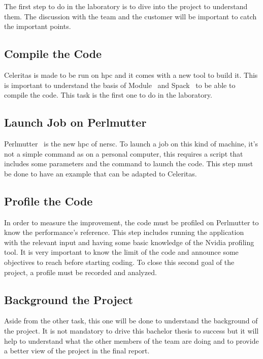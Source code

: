 The first step to do in the laboratory is to dive into the project to understand them.
The discussion with the team and the customer will be important to catch the important points.


\subsection{Compile the Code}
\label{spec:ch:activities:understand-the-project:compile-the-code}

Celeritas is made to be run on \acrshort{hpc} and it comes with a new tool to build it.
This is important to understand the basis of Module~\cite{Module} and Spack~\cite{Spack} to be able to compile the code.
This task is the first one to do in the laboratory.


\subsection{Launch Job on Perlmutter}
\label{spec:ch:activities:understand-the-project:launch-job-on-perlmutter}
Perlmutter~\cite{Perlmutter} is the new \acrshort{hpc} of \acrshort{nersc}.
To launch a job on this kind of machine, it's not a simple command as on a personal computer, this requires a script that includes some parameters and the command to launch the code.
This step must be done to have an example that can be adapted to Celeritas.


\subsection{Profile the Code}
\label{specspec:ch:activities:understand-the-project:profile-the-code}

In order to measure the improvement, the code must be profiled on Perlmutter to know the performance's reference.
This step includes running the application with the relevant input and having some basic knowledge of the Nvidia profiling tool.
It is very important to know the limit of the code and announce some objectives to reach before starting coding.
To close this second goal of the project, a profile must be recorded and analyzed.


\subsection{Background the Project}
\label{spec:ch:activities:understand-the-project:background-the-project}

Aside from the other task, this one will be done to understand the background of the project.
It is not mandatory to drive this bachelor thesis to success but it will help to understand what the other members of the team are doing and to provide a better view of the project in the final report.



